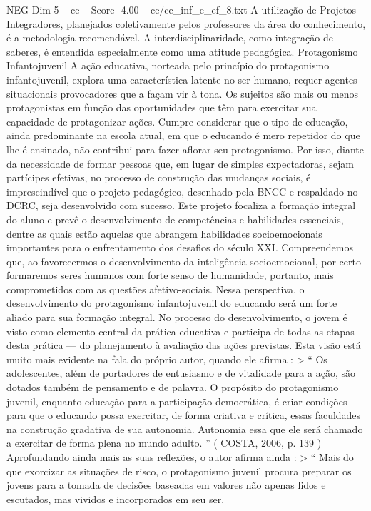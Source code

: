 \begin{textsample}{NEG Dim 5 – ce – Score -4.00 – ce/ce\_inf\_e\_ef\_8.txt}
A utilização de Projetos Integradores, planejados coletivamente pelos professores da área do conhecimento, é a metodologia recomendável.
A interdisciplinaridade, como integração de saberes, é entendida especialmente como uma atitude pedagógica.
Protagonismo Infantojuvenil A ação educativa, norteada pelo princípio do protagonismo infantojuvenil, explora uma característica latente no ser humano, requer agentes situacionais provocadores que a façam vir à tona.
Os sujeitos são mais ou menos protagonistas em função das oportunidades que têm para exercitar sua capacidade de protagonizar ações.
Cumpre considerar que o tipo de educação, ainda predominante na escola atual, em que o educando é mero repetidor do que lhe é ensinado, não contribui para fazer aflorar seu protagonismo.
Por isso, diante da necessidade de formar pessoas que, em lugar de simples expectadoras, sejam partícipes efetivas, no processo de construção das mudanças sociais, é imprescindível que o projeto pedagógico, desenhado pela BNCC e respaldado no DCRC, seja desenvolvido com sucesso.
Este projeto focaliza a formação integral do aluno e prevê o desenvolvimento de competências e habilidades essenciais, dentre as quais estão aquelas que abrangem habilidades socioemocionais importantes para o enfrentamento dos desafios do século XXI.
Compreendemos que, ao favorecermos o desenvolvimento da inteligência socioemocional, por certo formaremos seres humanos com forte senso de humanidade, portanto, mais comprometidos com as questões afetivo-sociais.
Nessa perspectiva, o desenvolvimento do protagonismo infantojuvenil do educando será um forte aliado para sua formação integral.
No processo do desenvolvimento, o jovem é visto como elemento central da prática educativa e participa de todas as etapas desta prática — do planejamento à avaliação das ações previstas.
Esta visão está muito mais evidente na fala do próprio autor, quando ele afirma : > “ Os adolescentes, além de portadores de entusiasmo e de vitalidade para a ação, são dotados também de pensamento e de palavra.
O propósito do protagonismo juvenil, enquanto educação para a participação democrática, é criar condições para que o educando possa exercitar, de forma criativa e crítica, essas faculdades na construção gradativa de sua autonomia.
Autonomia essa que ele será chamado a exercitar de forma plena no mundo adulto. ” ( COSTA, 2006, p. 139 ) Aprofundando ainda mais as suas reflexões, o autor afirma ainda : > “ Mais do que exorcizar as situações de risco, o protagonismo juvenil procura preparar os jovens para a tomada de decisões baseadas em valores não apenas lidos e escutados, mas vividos e incorporados em seu ser.

\end{textsample}
